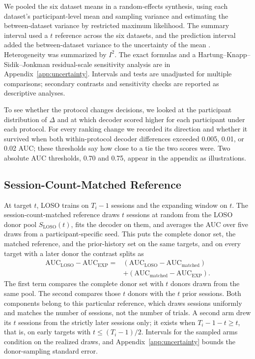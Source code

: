 \documentclass{ieeeaccess}
\newcommand{\AUC}{\mathrm{AUC}}
\newcommand{\LOSO}{\mathrm{LOSO}}
\newcommand{\EXP}{\mathrm{EXP}}
\begin{document}
We pooled the six dataset means in a random-effects synthesis, using each
dataset's participant-level mean and sampling variance and estimating the
between-dataset variance by restricted maximum likelihood. The summary interval
used a $t$ reference across the six datasets, and the prediction interval added
the between-dataset variance to the uncertainty of the mean
\cite{higgins2009reevaluation}. Heterogeneity was summarized by $I^2$. The exact
formulas and a Hartung--Knapp--Sidik--Jonkman residual-scale sensitivity
analysis \cite{rover2015hartung} are in Appendix~\ref{app:uncertainty}.
Intervals and tests are unadjusted for multiple comparisons; secondary contrasts
and sensitivity checks are reported as descriptive analyses.

To see whether the protocol changes decisions, we looked at the participant
distribution of $\Delta$ and at which decoder scored higher for each participant
under each protocol. For every ranking change we recorded its direction and
whether it survived when both within-protocol decoder differences exceeded
0.005, 0.01, or 0.02 AUC; these thresholds say how close to a tie the two scores
were. Two absolute AUC thresholds, 0.70 and 0.75, appear in the appendix as
illustrations.

\subsection{Session-Count-Matched Reference}
\label{sec:matched}
At target $t$, LOSO trains on $T_i-1$ sessions and the expanding window on $t$.
The session-count-matched reference draws $t$ sessions at random from the LOSO
donor pool $S_{\LOSO}(t)$, fits the decoder on them, and averages the AUC over
five draws from a participant-specific seed. This puts the complete donor set,
the matched reference, and the prior-history set on the same targets, and on
every target with a later donor the contrast splits as
\begin{align}
\AUC_{\LOSO}-\AUC_{\EXP}={}&
(\AUC_{\LOSO}-\AUC_{\mathrm{matched}})\nonumber\\
&+(\AUC_{\mathrm{matched}}-\AUC_{\EXP}).
\label{eq:partition}
\end{align}
The first term compares the complete donor set with $t$ donors drawn from the
same pool. The second compares those $t$ donors with the $t$ prior sessions.
Both components belong to this particular reference, which draws sessions
uniformly and matches the number of sessions, not the number of trials. A second
arm drew its $t$ sessions from the strictly later sessions only; it exists when
$T_i-1-t\geq t$, that is, on early targets with $t\leq(T_i-1)/2$. Intervals for
the sampled arms condition on the realized draws, and
Appendix~\ref{app:uncertainty} bounds the donor-sampling standard error.
\end{document}
